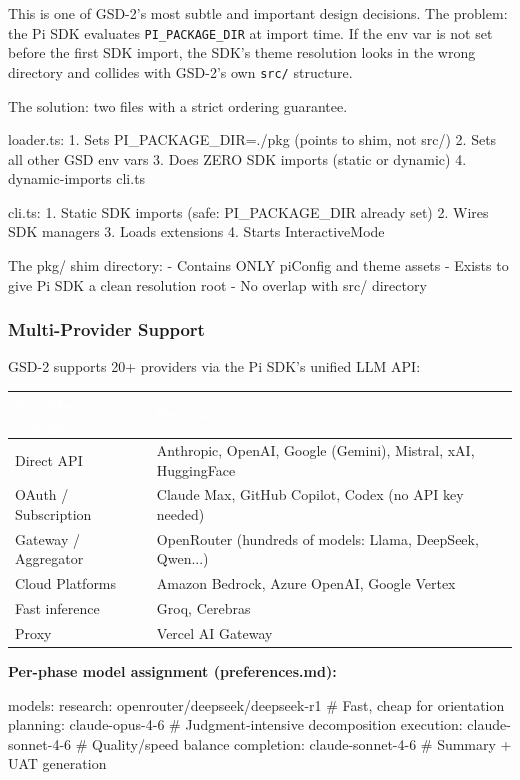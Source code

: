 \documentclass[11pt,letterpaper]{article}
\newcommand{\tableheader}[1]{\textbf{\sffamily\textcolor{white}{#1}}}
\begin{document}
This is one of GSD-2's most subtle and important design decisions. The problem: the Pi SDK evaluates \texttt{PI\_PACKAGE\_DIR} at import time. If the env var is not set before the first SDK import, the SDK's theme resolution looks in the wrong directory and collides with GSD-2's own \texttt{src/} structure.

The solution: two files with a strict ordering guarantee.

\begin{asciibox}
loader.ts:
  1. Sets PI_PACKAGE_DIR=./pkg (points to shim, not src/)
  2. Sets all other GSD env vars
  3. Does ZERO SDK imports (static or dynamic)
  4. dynamic-imports cli.ts

cli.ts:
  1. Static SDK imports (safe: PI_PACKAGE_DIR already set)
  2. Wires SDK managers
  3. Loads extensions
  4. Starts InteractiveMode

The pkg/ shim directory:
  - Contains ONLY piConfig and theme assets
  - Exists to give Pi SDK a clean resolution root
  - No overlap with src/ directory
\end{asciibox}

\subsubsection{Multi-Provider Support}

GSD-2 supports 20+ providers via the Pi SDK's unified LLM API:

\begin{center}
\begin{tabularx}{\textwidth}{L{4cm}X}
\toprule
{}
\tableheader{Provider Category} & \tableheader{Providers} \\
\midrule
Direct API & Anthropic, OpenAI, Google (Gemini), Mistral, xAI, HuggingFace \\
OAuth / Subscription & Claude Max, GitHub Copilot, Codex (no API key needed) \\
Gateway / Aggregator & OpenRouter (hundreds of models: Llama, DeepSeek, Qwen...) \\
Cloud Platforms & Amazon Bedrock, Azure OpenAI, Google Vertex \\
Fast inference & Groq, Cerebras \\
Proxy & Vercel AI Gateway \\
\bottomrule
\end{tabularx}
\end{center}

\textbf{Per-phase model assignment (preferences.md):}
\begin{asciibox}
models:
  research:   openrouter/deepseek/deepseek-r1  # Fast, cheap for orientation
  planning:   claude-opus-4-6                  # Judgment-intensive decomposition
  execution:  claude-sonnet-4-6                # Quality/speed balance
  completion: claude-sonnet-4-6                # Summary + UAT generation
\end{asciibox}
\end{document}
